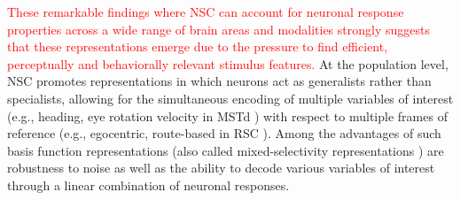 

\textcolor{red} {These remarkable findings where \ac{NSC} can account for neuronal response properties across a wide range of
brain areas and modalities strongly suggests that these 
 representations emerge due to the pressure to find efficient, perceptually and behaviorally relevant stimulus features.}
At the population level, \ac{NSC} promotes representations in which
neurons act as generalists rather than specialists,
allowing for the simultaneous encoding of multiple variables of interest
(e.g., heading, eye rotation velocity in \ac{MSTd} \citep{Beyeler2016})
with respect to multiple frames of reference
(e.g., egocentric, route-based in \ac{RSC} \citep{Rounds2016}).
Among the advantages of such basis function representations
\citep{Poggio1990,PougetSejnowski1997,PougetSnyder2000}
(also called mixed-selectivity representations
\citep{Eichenbaum2017,Fusi2016,Barak2013})
are robustness to noise as well as the ability to decode various variables of interest
through a linear combination of neuronal responses.

